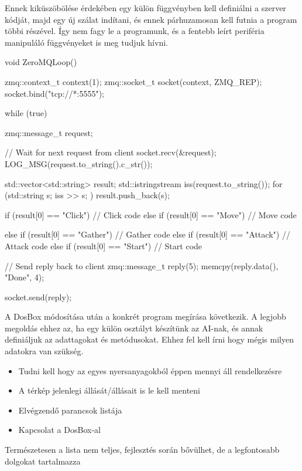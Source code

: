 Ennek kiküszöbölése érdekében egy külön függvényben kell definiálni a szerver kódját, majd egy új szálat indítani, és ennek párhuzamosan kell futnia a program többi részével. Így nem fagy le a programunk, és a fentebb leírt periféria manipuláló függvényeket is meg tudjuk hívni.
\begin{cpp}
void ZeroMQLoop()
{
    zmq::context_t context(1);
    zmq::socket_t socket(context, ZMQ_REP);
    socket.bind("tcp://*:5555");

    while (true) {
        zmq::message_t request;

        //  Wait for next request from client
        socket.recv(&request);
        LOG_MSG(request.to_string().c_str());

        std::vector<std::string> result;
        std::istringstream iss(request.to_string());
        for (std::string s; iss >> s; )
            result.push_back(s);

        if (result[0] == "Click")
        {
            // Click code
        }
        else if (result[0] == "Move")
        {
            // Move code
        }

        else if (result[0] == "Gather")
        {
            // Gather code
        }
        else if (result[0] == "Attack")
        {
            // Attack code
        }
        else if (result[0] == "Start")
        {
            // Start code
        }

        //  Send reply back to client
        zmq::message_t reply(5);
        memcpy(reply.data(), "Done", 4);
		
        socket.send(reply);
	}
}
\end{cpp}


A DosBox módosítása után a konkrét program megírása következik. A legjobb megoldás ehhez az, ha egy külön osztályt készítünk az AI-nak, és annak definiáljuk az adattagokat és metódusokat. Ehhez fel kell írni hogy mégis milyen adatokra van szükség.
\begin{itemize}
    \item Tudni kell hogy az egyes nyersanyagokból éppen mennyi áll rendelkezésre
    \item A térkép jelenlegi állását/állásait is le kell menteni
    \item Elvégzendő parancsok listája
    \item Kapcsolat a DosBox-al
\end{itemize}
Természetesen a lista nem teljes, fejlesztés során bővülhet, de a legfontosabb dolgokat tartalmazza

